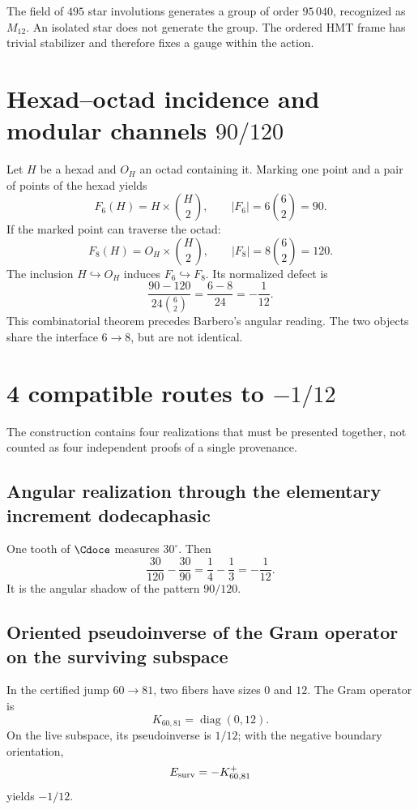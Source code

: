 The field of \(495\) star involutions generates a group of order
\(95\,040\), recognized as \(M_{12}\). An isolated star does not generate the
group. The ordered HMT frame has trivial stabilizer and therefore fixes a
gauge within the action.

\section{Hexad--octad incidence and modular channels \(90/120\)}

Let \(H\) be a hexad and \(O_H\) an octad containing it. Marking one point
and a pair of points of the hexad yields
\[
F_6(H)=H\times\binom H2,
\qquad
|F_6|=6\binom62=90.
\]
If the marked point can traverse the octad:
\[
F_8(H)=O_H\times\binom H2,
\qquad
|F_8|=8\binom62=120.
\]
The inclusion \(H\hookrightarrow O_H\) induces \(F_6\hookrightarrow F_8\).
Its normalized defect is
\[
\boxed{
\frac{90-120}{24\binom62}
=\frac{6-8}{24}
=-\frac1{12}.}
\]
This combinatorial theorem precedes Barbero’s angular reading. The
two objects share the interface \(6\to8\), but are not identical.

\section{4 compatible routes to \texorpdfstring{\(-1/12\)}{-1/12}}

The construction contains four realizations that must be presented together, not
counted as four independent proofs of a single provenance.

\subsection{Angular realization through the elementary increment dodecaphasic}

One tooth of \(\Cdoce\) measures \(30^\circ\). Then
\[
\frac{30}{120}-\frac{30}{90}
=\frac14-\frac13
=-\frac1{12}.
\]
It is the angular shadow of the pattern \(90/120\).

\subsection{Oriented pseudoinverse of the Gram operator on the surviving subspace}

In the certified jump \(60\to81\), two fibers have sizes \(0\) and
\(12\). The Gram operator is
\[
K_{60,81}=\operatorname{diag}(0,12).
\]
On the live subspace, its pseudoinverse is \(1/12\); with the negative
boundary orientation,
\[
E_{\rm surv}=-K_{60,81}^{+}
\]
yields \(-1/12\).

